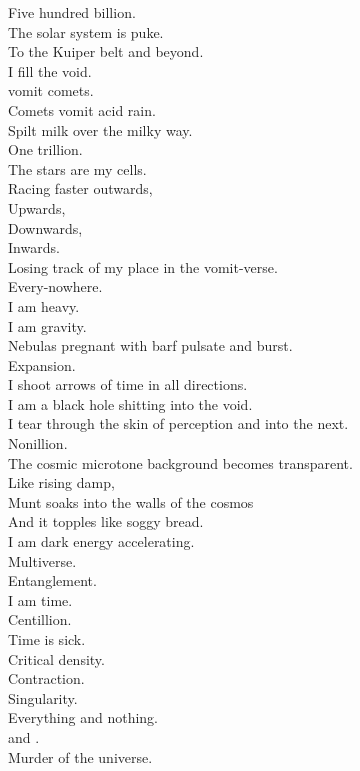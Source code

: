 Five hundred billion. \\
The solar system is puke. \\
To the Kuiper belt and beyond. \\
I fill the void. \\
 vomit comets. \\
Comets vomit acid rain. \\
Spilt milk over the milky way. \\

One trillion. \\
The stars are my cells. \\
Racing faster outwards, \\
Upwards, \\
Downwards, \\
Inwards. \\
Losing track of my place in the vomit-verse. \\
Every-nowhere. \\

I am heavy. \\
I am gravity. \\
Nebulas pregnant with barf pulsate and burst. \\
Expansion. \\
I shoot arrows of time in all directions. \\
I am a black hole shitting into the void. \\
I tear through the skin of perception and into the next. \\

Nonillion. \\
The cosmic microtone background becomes transparent. \\
Like rising damp, \\
Munt soaks into the walls of the cosmos \\
And it topples like soggy bread. \\
I am dark energy accelerating. \\
Multiverse. \\

Entanglement. \\
I am time. \\
Centillion. \\
Time is sick. \\
Critical density. \\
Contraction. \\
Singularity. \\
Everything and nothing. \\
 and . \\

Murder of the universe. \\
